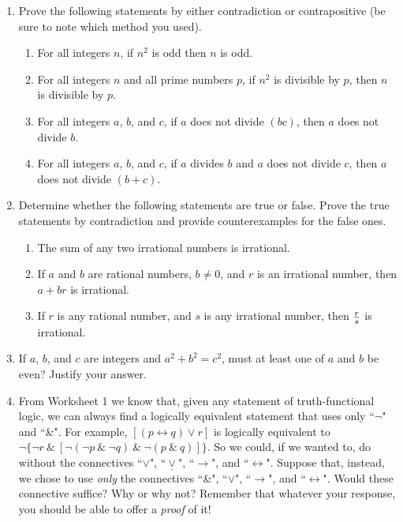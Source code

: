 \documentclass{article}
\begin{document}
\begin{enumerate}
\begin{enumerate}
\smallskip

\end{enumerate}

\item Prove the following statements by either contradiction or contrapositive (be sure to note which method you used).
\begin{enumerate}
\item For all integers $n$, if $n^2$ is odd then $n$ is odd.

\smallskip

\item For all integers $n$ and all prime numbers $p$, if $n^2$ is divisible by $p$, then $n$ is divisible by $p$.
\smallskip
\item For all integers $a$, $b$, and $c$, if $a$ does not divide $(bc)$, then $a$ does not divide $b$.
\smallskip

\item For all integers $a$, $b$, and $c$, if $a$ divides $b$ and $a$ does not divide $c$, then $a$ does not divide $(b+c)$.
\smallskip
\end{enumerate}

\item Determine whether the following statements are true or false. Prove the true statements by contradiction and provide counterexamples for the false ones.
\begin{enumerate}
\item The sum of any two irrational numbers is irrational.
\smallskip
\item If $a$ and $b$ are rational numbers, $b\neq 0$, and $r$ is an irrational number, then $a+br$ is irrational.
\smallskip
\item If $r$ is any rational number, and $s$ is any irrational number, then ${r\over s}$ is irrational.
\smallskip
\end{enumerate}

\item If $a$, $b$, and $c$ are integers and $a^2+b^2=c^2$, must at least one of $a$ and $b$ be even? Justify your answer.
\bigskip

\item From Worksheet 1 we know that, given any statement of truth-functional logic, we can always find a logically equivalent statement that uses only ``$\neg$" and ``\&". For example, $[(p\leftrightarrow q) \vee r]$ is logically equivalent to 
$\neg\{\neg r\ \&\ [\neg (\neg p\ \&\ \neg q)\ \&\ \neg (p\ \&\ q)]\}$. So we could, if we wanted to, do without the connectives ``$\vee$", ``$\underline \vee$", ``$\rightarrow$", and ``$\leftrightarrow$". Suppose that, instead, we chose to use {\it only} the connectives ``\&", ``$\vee$", ``$\rightarrow$", and ``$\leftrightarrow$". Would these connective suffice? Why or why not? Remember that whatever your response, you should be able to offer a {\it proof} of it!
\medskip


\end{enumerate}
\end{document}
